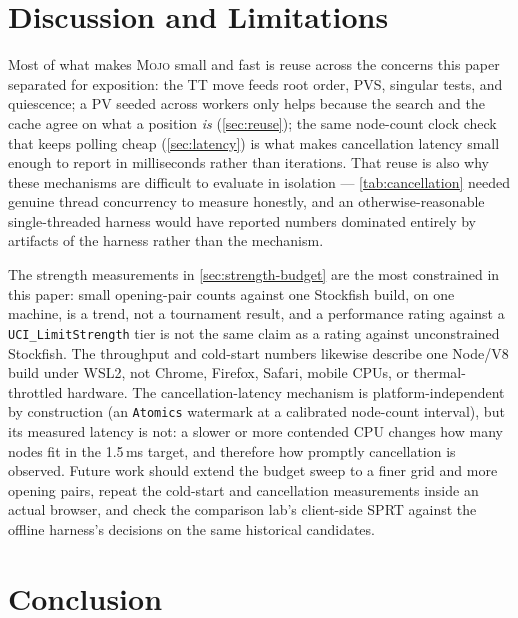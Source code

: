 \documentclass[10pt,twocolumn]{article}
\newcommand{\engine}{\textsc{Mojo}}
\newcommand{\code}[1]{\texttt{#1}}
\begin{document}
\section{Discussion and Limitations}
\label{sec:limitations}

Most of what makes \engine{} small and fast is reuse across the concerns this
paper separated for exposition: the TT move feeds root order, PVS,
singular tests, and quiescence; a PV seeded across workers only helps
because the search and the cache agree on what a position \emph{is}
(\cref{sec:reuse}); the same node-count clock check that keeps polling cheap
(\cref{sec:latency}) is what makes cancellation latency small enough to
report in milliseconds rather than iterations. That reuse is also why these
mechanisms are difficult to evaluate in isolation --- \cref{tab:cancellation}
needed genuine thread concurrency to measure honestly, and an
otherwise-reasonable single-threaded harness would have reported numbers
dominated entirely by artifacts of the harness rather than the mechanism.

The strength measurements in \cref{sec:strength-budget} are the most
constrained in this paper: small opening-pair counts against one Stockfish
build, on one machine, is a trend, not a tournament result, and a
performance rating against a \code{UCI\_LimitStrength} tier is not the same
claim as a rating against unconstrained Stockfish. The throughput and
cold-start numbers likewise describe one Node/V8 build under WSL2, not
Chrome, Firefox, Safari, mobile CPUs, or thermal-throttled hardware. The
cancellation-latency mechanism is platform-independent by construction (an
\code{Atomics} watermark at a calibrated node-count interval), but its
measured latency is not: a slower or more contended CPU changes how many
nodes fit in the 1.5\,ms target, and therefore how promptly cancellation is
observed. Future work should extend the budget sweep to a finer grid and more
opening pairs, repeat the cold-start and cancellation measurements inside an
actual browser, and check the comparison lab's client-side SPRT against the
offline harness's decisions on the same historical candidates.

\section{Conclusion}
\end{document}
